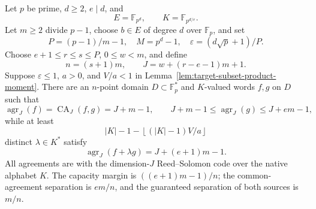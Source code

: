\begin{proposition}
\label{prop:target-subfield-norm-compiler}
Let $p$ be prime, $d\ge2$, $e\mid d$, and
\[
 E=\mathbb F_{p^d},\qquad K=\mathbb F_{p^{d/e}}.
\]
Let $m\ge2$ divide $p-1$, choose $b\in E$ of degree $d$ over
$\mathbb F_p$, and set
\[
 P=(p-1)/m-1,\quad M=p^d-1,\quad
 \varepsilon=(d\sqrt p+1)/P.
\]
Choose $e+1\le r\le s\le P$, $0\le w<m$, and define
\[
 n=(s+1)m,\qquad J=w+(r-e-1)m+1.
\]
Suppose $\varepsilon\le1$, $a>0$, and $V/a<1$ in
Lemma~\ref{lem:target-subset-product-moment}.
There are an $n$-point domain $D\subset\mathbb F_p^*$ and
$K$-valued words $f,g$ on $D$ such that
\[
 \operatorname{agr}_J(f)=\operatorname{CA}_J(f,g)=J+m-1,
 \qquad J+m-1\le\operatorname{agr}_J(g)\le J+em-1,
\]
while at least
\[
 |K|-1-\left\lfloor (|K|-1)V/a\right\rfloor
\]
distinct $\lambda\in K^*$ satisfy
\[
 \operatorname{agr}_J(f+\lambda g)=J+(e+1)m-1.
\]
All agreements are with the dimension-$J$ Reed--Solomon code over
the native alphabet $K$.  The capacity margin is
$((e+1)m-1)/n$; the common-agreement separation is $em/n$, and
the guaranteed separation of both sources is $m/n$.
\end{proposition}
